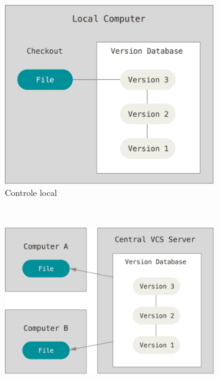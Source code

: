 
\begin{figure}[h]
	\centering
    \begin{subfigure}[b]{0.3\textwidth}
      \includegraphics[width=\textwidth]{pfc/figuras/control-version-local.png}
      \caption{Controle local}
      \label{fig:version-control-local}
    \end{subfigure}
    ~
	\begin{subfigure}[b]{0.3\textwidth}
      \includegraphics[width=\textwidth]{pfc/figuras/control-version-centralized.png}

\end{subfigure}
\end{figure}
